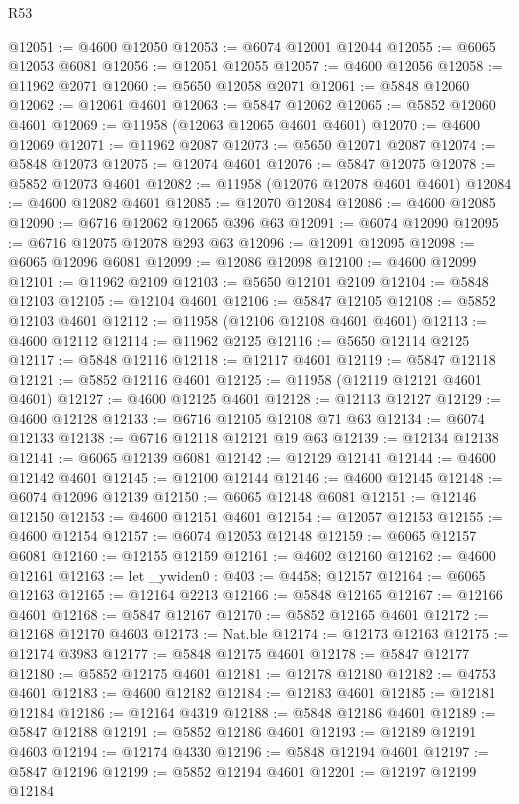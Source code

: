 \begin{lexlean}{R53}
\begin{coremodule}
@12051 := @4600 @12050
@12053 := @6074 @12001 @12044
@12055 := @6065 @12053 @6081
@12056 := @12051 @12055
@12057 := @4600 @12056
@12058 := @11962 @2071
@12060 := @5650 @12058 @2071
@12061 := @5848 @12060
@12062 := @12061 @4601
@12063 := @5847 @12062
@12065 := @5852 @12060 @4601
@12069 := @11958 (@12063 @12065 @4601 @4601)
@12070 := @4600 @12069
@12071 := @11962 @2087
@12073 := @5650 @12071 @2087
@12074 := @5848 @12073
@12075 := @12074 @4601
@12076 := @5847 @12075
@12078 := @5852 @12073 @4601
@12082 := @11958 (@12076 @12078 @4601 @4601)
@12084 := @4600 @12082 @4601
@12085 := @12070 @12084
@12086 := @4600 @12085
@12090 := @6716 @12062 @12065 @396 @63
@12091 := @6074 @12090
@12095 := @6716 @12075 @12078 @293 @63
@12096 := @12091 @12095
@12098 := @6065 @12096 @6081
@12099 := @12086 @12098
@12100 := @4600 @12099
@12101 := @11962 @2109
@12103 := @5650 @12101 @2109
@12104 := @5848 @12103
@12105 := @12104 @4601
@12106 := @5847 @12105
@12108 := @5852 @12103 @4601
@12112 := @11958 (@12106 @12108 @4601 @4601)
@12113 := @4600 @12112
@12114 := @11962 @2125
@12116 := @5650 @12114 @2125
@12117 := @5848 @12116
@12118 := @12117 @4601
@12119 := @5847 @12118
@12121 := @5852 @12116 @4601
@12125 := @11958 (@12119 @12121 @4601 @4601)
@12127 := @4600 @12125 @4601
@12128 := @12113 @12127
@12129 := @4600 @12128
@12133 := @6716 @12105 @12108 @71 @63
@12134 := @6074 @12133
@12138 := @6716 @12118 @12121 @19 @63
@12139 := @12134 @12138
@12141 := @6065 @12139 @6081
@12142 := @12129 @12141
@12144 := @4600 @12142 @4601
@12145 := @12100 @12144
@12146 := @4600 @12145
@12148 := @6074 @12096 @12139
@12150 := @6065 @12148 @6081
@12151 := @12146 @12150
@12153 := @4600 @12151 @4601
@12154 := @12057 @12153
@12155 := @4600 @12154
@12157 := @6074 @12053 @12148
@12159 := @6065 @12157 @6081
@12160 := @12155 @12159
@12161 := @4602 @12160
@12162 := @4600 @12161
@12163 := let _ywiden0 : @403 := @4458; @12157
@12164 := @6065 @12163
@12165 := @12164 @2213
@12166 := @5848 @12165
@12167 := @12166 @4601
@12168 := @5847 @12167
@12170 := @5852 @12165 @4601
@12172 := @12168 @12170 @4603
@12173 := Nat.ble
@12174 := @12173 @12163
@12175 := @12174 @3983
@12177 := @5848 @12175 @4601
@12178 := @5847 @12177
@12180 := @5852 @12175 @4601
@12181 := @12178 @12180
@12182 := @4753 @4601
@12183 := @4600 @12182
@12184 := @12183 @4601
@12185 := @12181 @12184
@12186 := @12164 @4319
@12188 := @5848 @12186 @4601
@12189 := @5847 @12188
@12191 := @5852 @12186 @4601
@12193 := @12189 @12191 @4603
@12194 := @12174 @4330
@12196 := @5848 @12194 @4601
@12197 := @5847 @12196
@12199 := @5852 @12194 @4601
@12201 := @12197 @12199 @12184

\end{coremodule}
\end{lexlean}
